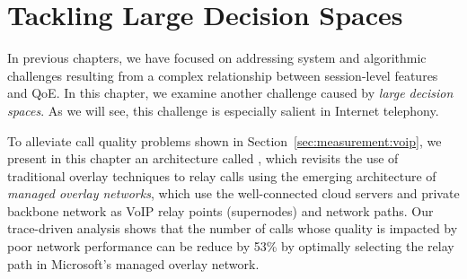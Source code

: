 \chapter{Tackling Large Decision Spaces}
\label{ch:via}



\providecommand{\ControlPlane}{{video optimization system}\xspace}
\providecommand{\mdn}{{MDN}\xspace}
\providecommand{\managed}{{managed overlay network}\xspace}
\providecommand{\Managed}{{Managed overlay network}\xspace}
\providecommand{\voip}{{audio conference application}\xspace}
\providecommand{\Voip}{{Audio conference application}\xspace}


\providecommand{\skype}{{Skype}\xspace}
\providecommand{\azure}{{ABC}\xspace}
\providecommand{\direct}{{default}\xspace}
\providecommand{\option}{{relaying option}\xspace}
\providecommand{\options}{{relaying options}\xspace}


In previous chapters, we have focused on addressing system and 
algorithmic challenges resulting from a complex relationship between 
session-level features and QoE.
In this chapter, we examine another
challenge caused by {\em large decision spaces}.
As we will see, this challenge is especially salient in Internet telephony.

To alleviate call quality problems shown in Section~\ref{sec:measurement:voip},
we present in this chapter an architecture called {\em \hybrid}, which revisits the 
use of traditional overlay techniques to relay calls using the emerging architecture 
of {\em managed overlay networks}, which use the well-connected cloud servers
and private backbone network as VoIP relay points (supernodes) and network paths. 
Our trace-driven analysis shows that the number of calls whose quality is impacted 
by poor network performance can be reduce by 53\% by optimally selecting the 
relay path in Microsoft's managed overlay network.

